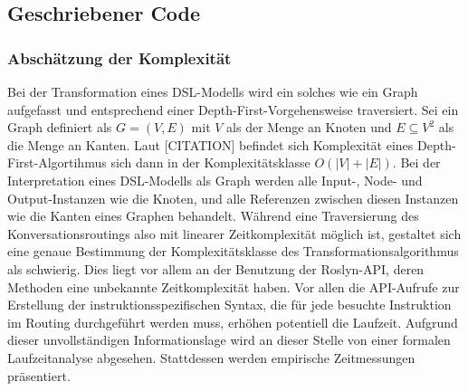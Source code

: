 \subsection{Geschriebener Code}

\subsubsection{Abschätzung der Komplexität}
\label{subsubsec:Abschaetzung der Komplexitaet}
Bei der Transformation eines DSL-Modells wird ein solches wie ein Graph aufgefasst und entsprechend einer Depth-First-Vorgehensweise traversiert. Sei ein Graph definiert als $G = (V, E)$ mit $V$ als der Menge an Knoten und $E \subseteq V^{2}$ als die Menge an Kanten. Laut [CITATION] befindet sich Komplexität eines Depth-First-Algortihmus sich dann in der Komplexitätsklasse $O(\left\vert{V}\right\vert + \left\vert{E}\right\vert)$. Bei der Interpretation eines DSL-Modells als Graph werden alle Input-, Node- und Output-Instanzen wie die Knoten, und alle Referenzen zwischen diesen Instanzen wie die Kanten eines Graphen behandelt. Während eine Traversierung des Konversationsroutings also mit linearer Zeitkomplexität möglich ist, gestaltet sich eine genaue Bestimmung der Komplexitätsklasse des Transformationsalgorithmus als schwierig. Dies liegt vor allem an der Benutzung der Roslyn-API, deren Methoden eine unbekannte Zeitkomplexität haben. Vor allen die API-Aufrufe zur Erstellung der instruktionsspezifischen Syntax, die für jede besuchte Instruktion im Routing durchgeführt werden muss, erhöhen potentiell die Laufzeit.
\newline
Aufgrund dieser unvollständigen Informationslage wird an dieser Stelle von einer formalen Laufzeitanalyse abgesehen. Stattdessen werden empirische Zeitmessungen präsentiert.

